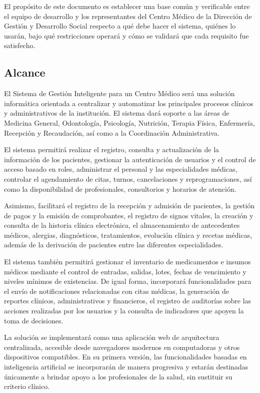 \documentclass[11pt,a4paper]{article}
\begin{document}
	El propósito de este documento es establecer una base común y verificable entre el equipo de desarrollo y los representantes del Centro Médico de la Dirección de Gestión y Desarrollo Social respecto a qué debe hacer el sistema, quiénes lo usarán, bajo qué restricciones operará y cómo se validará que cada requisito fue satisfecho.
	
	
	\subsection{ Alcance}
	
	El Sistema de Gestión Inteligente para un Centro Médico será una solución informática orientada a centralizar y automatizar los principales procesos clínicos y administrativos de la institución. El sistema dará soporte a las áreas de Medicina General, Odontología, Psicología, Nutrición, Terapia Física, Enfermería, Recepción y Recaudación, así como a la Coordinación Administrativa.
	
	El sistema permitirá realizar el registro, consulta y actualización de la información de los pacientes, gestionar la autenticación de usuarios y el control de acceso basado en roles, administrar el personal y las especialidades médicas, controlar el agendamiento de citas, turnos, cancelaciones y reprogramaciones, así como la disponibilidad de profesionales, consultorios y horarios de atención.
	
	Asimismo, facilitará el registro de la recepción y admisión de pacientes, la gestión de pagos y la emisión de comprobantes, el registro de signos vitales, la creación y consulta de la historia clínica electrónica, el almacenamiento de antecedentes médicos, alergias, diagnósticos, tratamientos, evolución clínica y recetas médicas, además de la derivación de pacientes entre las diferentes especialidades.
	
	El sistema también permitirá gestionar el inventario de medicamentos e insumos médicos mediante el control de entradas, salidas, lotes, fechas de vencimiento y niveles mínimos de existencias. De igual forma, incorporará funcionalidades para el envío de notificaciones relacionadas con citas médicas, la generación de reportes clínicos, administrativos y financieros, el registro de auditorías sobre las acciones realizadas por los usuarios y la consulta de indicadores que apoyen la toma de decisiones.
	
	La solución se implementará como una aplicación web de arquitectura centralizada, accesible desde navegadores modernos en computadoras y otros dispositivos compatibles. En su primera versión, las funcionalidades basadas en inteligencia artificial se incorporarán de manera progresiva y estarán destinadas únicamente a brindar apoyo a los profesionales de la salud, sin sustituir su criterio clínico.
	
\end{document}
